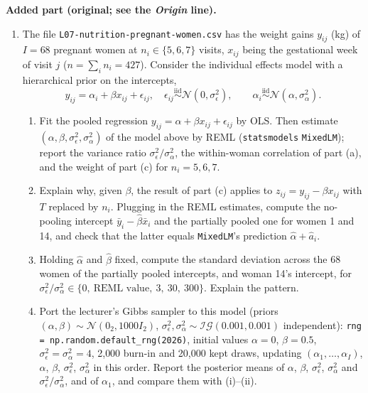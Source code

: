\documentclass[11pt,a4paper]{article}
\numberwithin{equation}{questao}
\newenvironment{enunciado}{\par\begingroup\small}{\endgroup\par}
\newcommand{\N}{\mathcal{N}}
\newcommand{\IG}{\mathcal{IG}}
\begin{document}
\begin{enunciado}
\textbf{Added part (original; see the \emph{Origin} line).}
\begin{enumerate}[label=(\alph*),leftmargin=2.4em,topsep=1pt,itemsep=1pt,start=4]
\item The file \texttt{L07-nutrition-pregnant-women.csv} has the weight gains $y_{ij}$ (kg) of $I=68$ pregnant women at
$n_i\in\{5,6,7\}$ visits, $x_{ij}$ being the gestational week of visit $j$ ($n=\sum_in_i=427$). Consider the individual
effects model with a hierarchical prior on the intercepts,
\begin{equation*}
y_{ij}=\alpha_i+\beta x_{ij}+\epsilon_{ij},\quad \epsilon_{ij}\overset{\text{iid}}{\sim}\N(0,\sigma_\epsilon^2),\qquad
\alpha_i\overset{\text{iid}}{\sim}\N(\alpha,\sigma_\alpha^2).
\end{equation*}
\begin{enumerate}[label=(\roman*),leftmargin=2.0em,topsep=1pt,itemsep=1pt]
\item Fit the pooled regression $y_{ij}=\alpha+\beta x_{ij}+\epsilon_{ij}$ by OLS. Then estimate $(\alpha,\beta,\sigma_\epsilon^2,\sigma_\alpha^2)$
of the model above by REML (\texttt{statsmodels} \texttt{MixedLM}); report the variance ratio $\sigma_\epsilon^2/\sigma_\alpha^2$, the
within-woman correlation of part (a), and the weight of part (c) for $n_i=5,6,7$.
\item Explain why, given $\beta$, the result of part (c) applies to $z_{ij}=y_{ij}-\beta x_{ij}$ with $T$ replaced by $n_i$.
Plugging in the REML estimates, compute the no-pooling intercept $\bar y_i-\hat\beta\bar x_i$ and the partially pooled one
for women 1 and 14, and check that the latter equals \texttt{MixedLM}'s prediction $\hat\alpha+\hat a_i$.
\item Holding $\hat\alpha$ and $\hat\beta$ fixed, compute the standard deviation across the 68 women of the partially pooled
intercepts, and woman 14's intercept, for $\sigma_\epsilon^2/\sigma_\alpha^2\in\{0,\ \text{REML value},\ 3,\ 30,\ 300\}$. Explain the
pattern.
\item Port the lecturer's Gibbs sampler to this model (priors $(\alpha,\beta)\sim\N(0_2,1000I_2)$, $\sigma_\epsilon^2,\sigma_\alpha^2\sim\IG(0.001,0.001)$
independent): \texttt{rng = np.random.default\_rng(2026)}, initial values $\alpha=0$, $\beta=0.5$, $\sigma_\epsilon^2=\sigma_\alpha^2=4$,
2{,}000 burn-in and 20{,}000 kept draws, updating $(\alpha_1,\dots,\alpha_I)$, $\alpha$, $\beta$, $\sigma_\epsilon^2$, $\sigma_\alpha^2$ in this order.
Report the posterior means of $\alpha$, $\beta$, $\sigma_\epsilon^2$, $\sigma_\alpha^2$ and $\sigma_\epsilon^2/\sigma_\alpha^2$, and of $\alpha_1$, and compare them with (i)--(ii).
\end{enumerate}
\end{enumerate}
\end{enunciado}
\end{document}
